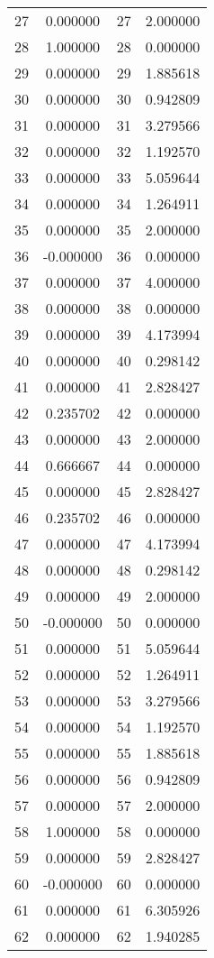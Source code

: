 \documentclass[12pt]{article}
\begin{document}
\begin{longtable}{@{}cccc@{}}
27 & 0.000000 & 27 & 2.000000 \\
28 & 1.000000 & 28 & 0.000000 \\
29 & 0.000000 & 29 & 1.885618 \\
30 & 0.000000 & 30 & 0.942809 \\
31 & 0.000000 & 31 & 3.279566 \\
32 & 0.000000 & 32 & 1.192570 \\
33 & 0.000000 & 33 & 5.059644 \\
34 & 0.000000 & 34 & 1.264911 \\
35 & 0.000000 & 35 & 2.000000 \\
36 & -0.000000 & 36 & 0.000000 \\
37 & 0.000000 & 37 & 4.000000 \\
38 & 0.000000 & 38 & 0.000000 \\
39 & 0.000000 & 39 & 4.173994 \\
40 & 0.000000 & 40 & 0.298142 \\
41 & 0.000000 & 41 & 2.828427 \\
42 & 0.235702 & 42 & 0.000000 \\
43 & 0.000000 & 43 & 2.000000 \\
44 & 0.666667 & 44 & 0.000000 \\
45 & 0.000000 & 45 & 2.828427 \\
46 & 0.235702 & 46 & 0.000000 \\
47 & 0.000000 & 47 & 4.173994 \\
48 & 0.000000 & 48 & 0.298142 \\
49 & 0.000000 & 49 & 2.000000 \\
50 & -0.000000 & 50 & 0.000000 \\
51 & 0.000000 & 51 & 5.059644 \\
52 & 0.000000 & 52 & 1.264911 \\
53 & 0.000000 & 53 & 3.279566 \\
54 & 0.000000 & 54 & 1.192570 \\
55 & 0.000000 & 55 & 1.885618 \\
56 & 0.000000 & 56 & 0.942809 \\
57 & 0.000000 & 57 & 2.000000 \\
58 & 1.000000 & 58 & 0.000000 \\
59 & 0.000000 & 59 & 2.828427 \\
60 & -0.000000 & 60 & 0.000000 \\
61 & 0.000000 & 61 & 6.305926 \\
62 & 0.000000 & 62 & 1.940285 \\

\end{longtable}
\end{document}

